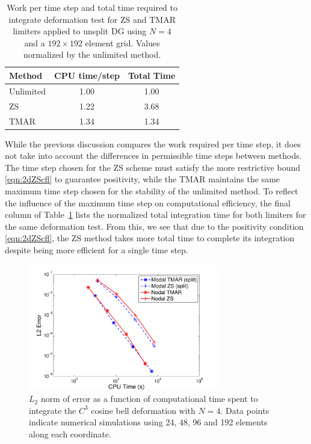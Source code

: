 \documentclass{ametsoc}
\begin{document}
\begin{table}[!hb]
\begin{tabular}{lcc}
\toprule
  Method & CPU time/step & Total Time \\
\midrule
Unlimited & 1.00 & 1.00  \\
ZS & 1.22 & 3.68  \\
TMAR & 1.34 & 1.34  \\
\bottomrule
\end{tabular}
\caption{Work per time step and total time required to integrate deformation test for ZS and TMAR limiters applied to unsplit DG using $N=4$ and a $192\times192$ element grid. Values normalized by the unlimited method.}
\label{timingTable}
\end{table}

While the previous discussion compares the work required per time step, it does not take into account the differences in permissible time steps between methods. The time step chosen for the ZS scheme must satisfy the more restrictive bound \eqref{eqn:2dZScfl} to guarantee positivity, while the TMAR maintains the same maximum time step chosen for the stability of the unlimited method. To reflect the influence of the maximum time step on computational efficiency, the final column of Table~\ref{timingTable} lists the normalized total integration time for both limiters for the same deformation test. From this, we see that due to the positivity condition \eqref{eqn:2dZScfl}, the ZS method takes more total time to complete its integration despite being more efficient for a single time step.

\begin{figure}[!ht]
\includegraphics[width=0.74\textwidth]{figs/2d/cosbellDef_L2Cpu.pdf}
\caption{$L_2$ norm of error as a function of computational time spent to integrate the $C^3$ cosine bell deformation with $N=4$. Data points indicate numerical simulations using 24, 48, 96 and 192 elements along each coordinate. }
\label{fig:L2cpu}
\end{figure}
\end{document}
